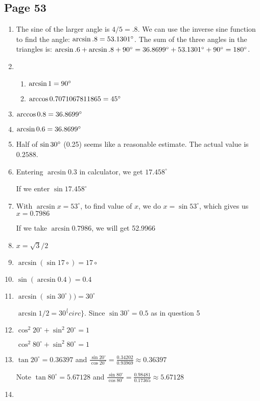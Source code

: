 \documentclass{article}
\newenvironment{solutions}[1]
{\subsection*{#1}
 \begin{enumerate}[leftmargin=1.5em]}
{\end{enumerate}}
\newcommand{\solution}{\item}
\newenvironment{subsolutions}
{\begin{enumerate}}
{\end{enumerate}}
\begin{document}
\begin{solutions}{Page 53}
\solution %
The sine of the larger angle is $4/5=.8$. We can use the inverse sine function to find the angle: $\arcsin{.8} = 53.1301\degree$. The sum of the three angles in the triangles is: $\arcsin{.6} + \arcsin{.8} + 90\degree = 36.8699\degree + 53.1301\degree + 90\degree = 180\degree$.

\solution %
\begin{subsolutions}
\item $\arcsin{1} = 90\degree$
\item $\arccos{0.7071067811865} = 45\degree$
\end{subsolutions}

\solution %
$\arccos{0.8} = 36.8699\degree$

\solution %
$\arcsin{0.6} = 36.8699\degree$

\solution %
Half of $\sin{30\degree}$ (0.25) seems like a reasonable estimate. The actual value is $0.2588$.

\solution %
Entering $\arcsin 0.3$ in calculator, we get $17.458^{\circ}$

If we enter $\sin 17.458^{\circ}$

\solution %
With $\arcsin x = 53^{\circ}$, to find value of $x$, we do $x = \sin 53^{\circ}$, which gives us $x = 0.7986$

If we take $\arcsin 0.7986$, we will get 52.9966

\solution %
$x = \sqrt{3}/2$

\solution %
$\arcsin (\sin 17\circ) = 17\circ$
\solution %
$\sin (\arcsin 0.4) = 0.4$
\solution %
$\arcsin (\sin 30^{\circ})) = 30^{\circ}$

$\arcsin 1/2 = 30^\{circ\}$. Since $\sin 30^{\circ} = 0.5$ as in question 5
\solution %
$\cos^2 20^{\circ} + \sin^2 20^{\circ} = 1$

$\cos^2 80^{\circ} + \sin^2 80^{\circ} = 1$

\solution %
$\tan 20^{\circ} = 0.36397$ and $\frac{\sin 20^{\circ}}{\cos 20^{\circ}} = \frac{0.34202}{0.93969}\approx 0.36397$

Note $\tan 80^{\circ} = 5.67128$ and $\frac{\sin 80^{\circ}}{\cos 80^{\circ}} = \frac{0.98481}{0.17365}\approx 5.67128$
\solution %


\end{solutions}
\end{document}
